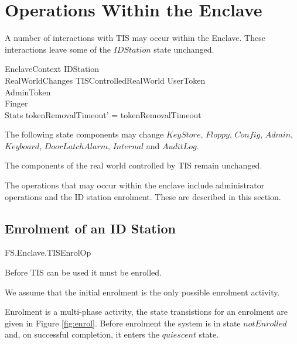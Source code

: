 
\chapter{Operations Within the Enclave}
\label{sec:Enclave}

A number of interactions with TIS may occur within the
Enclave.
These interactions leave some of the $IDStation$ state unchanged.

\begin{schema}{EnclaveContext}
        \Delta IDStation
\\      RealWorldChanges
\also
        \Xi TISControlledRealWorld
\also
        \Xi UserToken
\\      \Xi AdminToken
\\      \Xi Finger
\\      \Xi Stats
\where
        tokenRemovalTimeout' = tokenRemovalTimeout
\end{schema}
\begin{Zcomment}
\item
The following state components may change $KeyStore$, 
$Floppy$, $Config$, $Admin$, $Keyboard$,
$DoorLatchAlarm$, $Internal$ and $AuditLog$. 
\item
The components of the real world controlled by TIS remain unchanged.
\end{Zcomment}

The operations that may occur within the enclave include
administrator operations and the ID station enrolment. These are
described in this section.

\section{Enrolment of an ID Station}

\begin{traceunit}{FS.Enclave.TISEnrolOp}
\end{traceunit}

Before TIS can be used it must be enrolled.

We assume
that the initial enrolment is the only possible enrolment activity.

Enrolment is a multi-phase activity, the state transistions for an
enrolment are given in Figure \ref{fig:enrol}. Before enrolment the
system is in state $notEnrolled$ and, on successful completion, it
enters the $quiescent$ state.

